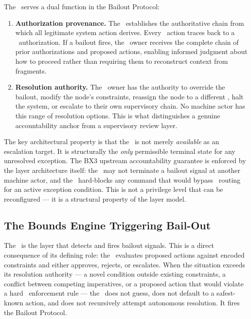 The \purpose\ serves a dual function in the Bailout Protocol:

\begin{enumerate}
\item \textbf{Authorization provenance.} The \purpose\ establishes the authoritative chain from which all legitimate system action derives. Every \bounds\ action traces back to a \purpose\ authorization. If a bailout fires, the \purpose\ owner receives the complete chain of prior authorizations and proposed actions, enabling informed judgment about how to proceed rather than requiring them to reconstruct context from fragments.
\item \textbf{Resolution authority.} The \purpose\ owner has the authority to override the bailout, modify the node's constraints, reassign the node to a different \bounds, halt the system, or escalate to their own supervisory chain. No machine actor has this range of resolution options. This is what distinguishes a genuine accountability anchor from a supervisory review layer.
\end{enumerate}

The key architectural property is that the \purpose\ is not merely \textit{available} as an escalation target. It is structurally the \textit{only} permissible terminal state for any unresolved exception. The BX3 upstream accountability guarantee is enforced by the layer architecture itself: the \bounds\ may not terminate a bailout signal at another machine actor, and the \fact\ hard-blocks any command that would bypass \purpose\ routing for an active exception condition. This is not a privilege level that can be reconfigured --- it is a structural property of the layer model.

\subsection{The Bounds Engine Triggering Bail-Out}
\label{sec:bounds-trigger}

The \bounds\ is the layer that detects and fires bailout signals. This is a direct consequence of its defining role: the \bounds\ evaluates proposed actions against encoded constraints and either approves, rejects, or escalates. When the situation exceeds its resolution authority --- a novel condition outside existing constraints, a conflict between competing imperatives, or a proposed action that would violate a hard \fact\ enforcement rule --- the \bounds\ does not guess, does not default to a safest-known action, and does not recursively attempt autonomous resolution. It fires the Bailout Protocol.

